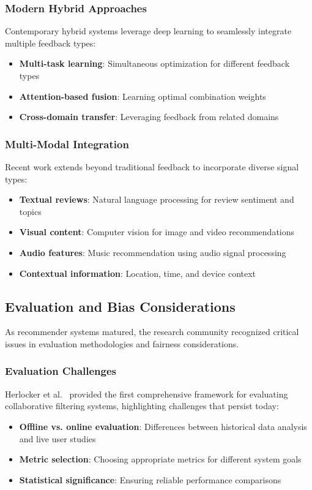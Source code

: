 \subsubsection{Modern Hybrid Approaches}
Contemporary hybrid systems leverage deep learning to seamlessly integrate multiple feedback types:
\begin{itemize}
    \item \textbf{Multi-task learning}: Simultaneous optimization for different feedback types~\cite{ma2018modeling}
    \item \textbf{Attention-based fusion}: Learning optimal combination weights~\cite{chen2017attentive}
    \item \textbf{Cross-domain transfer}: Leveraging feedback from related domains~\cite{zhu2019transfer}
\end{itemize}

\subsubsection{Multi-Modal Integration}
Recent work extends beyond traditional feedback to incorporate diverse signal types:
\begin{itemize}
    \item \textbf{Textual reviews}: Natural language processing for review sentiment and topics~\cite{zheng2018joint}
    \item \textbf{Visual content}: Computer vision for image and video recommendations~\cite{wei2021contrastive}
    \item \textbf{Audio features}: Music recommendation using audio signal processing~\cite{van2013deep}
    \item \textbf{Contextual information}: Location, time, and device context~\cite{adomavicius2011context}
\end{itemize}

\subsection{Evaluation and Bias Considerations}

As recommender systems matured, the research community recognized critical issues in evaluation methodologies and fairness considerations.

\subsubsection{Evaluation Challenges}
Herlocker et al.~\cite{herlocker2004evaluating} provided the first comprehensive framework for evaluating collaborative filtering systems, highlighting challenges that persist today:
\begin{itemize}
    \item \textbf{Offline vs. online evaluation}: Differences between historical data analysis and live user studies
    \item \textbf{Metric selection}: Choosing appropriate metrics for different system goals
    \item \textbf{Statistical significance}: Ensuring reliable performance comparisons
\end{itemize}

